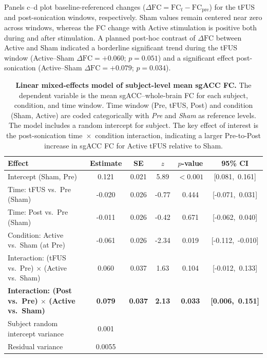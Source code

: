 Panels c–d plot baseline-referenced changes ($\Delta\mathrm{FC}=\mathrm{FC}_t-\mathrm{FC}_{\mathrm{pre}}$) for the tFUS and post-sonication windows, respectively. Sham values remain centered near zero across windows, whereas the FC change with Active stimulation is positive both during and after stimulation. A planned post-hoc contrast of $\Delta\mathrm{FC}$ between Active and Sham indicated a borderline significant trend during the tFUS window (Active–Sham $\Delta\mathrm{FC}=+0.060$; $p=0.051$) and a significant effect post-sonication (Active–Sham $\Delta\mathrm{FC}=+0.079$; $p=0.034$). 

\begin{table}[t]
    \centering
    \caption{\textbf{Linear mixed-effects model of subject-level mean sgACC FC.}
    The dependent variable is the mean sgACC--whole-brain FC for each subject, condition, 
    and time window. Time window (Pre, tFUS, Post) and condition (Sham, Active) are coded 
    categorically with \textit{Pre} and \textit{Sham} as reference levels. The model includes 
    a random intercept for subject. The key effect of interest is the post-sonication 
    time~$\times$~condition interaction, indicating a larger Pre-to-Post increase in sgACC FC 
    for Active tFUS relative to Sham.}
    \label{tab:mixedlm_sgacc}
    \begin{tabular}{lccccc}
    \toprule
    Effect & Estimate & SE & $z$ & $p$-value & 95\% CI \\
    \midrule
    Intercept (Sham, Pre)                                       & 0.121 & 0.021 &  5.89 & $<0.001$ & [0.081,\ 0.161] \\
    Time: tFUS vs.\ Pre (Sham)                                  &-0.020 & 0.026 & -0.77 & 0.444   & [-0.071,\ 0.031] \\
    Time: Post vs.\ Pre (Sham)                                 &-0.011 & 0.026 & -0.42 & 0.671   & [-0.062,\ 0.040] \\
    Condition: Active vs.\ Sham (at Pre)                       &-0.061 & 0.026 & -2.34 & 0.019   & [-0.112,\ -0.010] \\
    Interaction: (tFUS vs.\ Pre) $\times$ (Active vs.\ Sham)    & 0.060 & 0.037 &  1.63 & 0.104   & [-0.012,\ 0.133] \\
    \bf{Interaction: (Post vs.\ Pre) $\times$ (Active vs.\ Sham)}  & \bf{0.079} & \bf{0.037} &  \bf{2.13} & \bf{0.033}   & \bf{ [0.006,\ 0.151] } \\
    \midrule
    Subject random intercept variance                          & 0.001 &       &       &         &              \\
    Residual variance                                          & 0.0055&       &       &         &              \\
    \bottomrule
    \end{tabular}
    \end{table}



